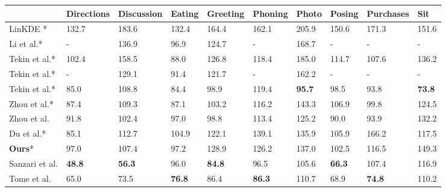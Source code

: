 \documentclass[10pt,journal,compsoc]{IEEEtran}
\makeatletter
\newcommand*{\etal}{et al.\@\xspace}
\makeatother
\begin{document}
\begin{table*}
\begin{center}
\begin{tabularx}{\linewidth}{lsssssssss}
\toprule \midrule
						& Directions     & Discussion		& Eating	 & Greeting       & Phoning        & Photo           & Posing         & Purchases      	& Sit\\
\toprule \midrule
LinKDE \cite{h36m_pami}*           		& 132.7          & 183.6      		& 132.4       	 & 164.4          & 162.1          & 205.9           & 150.6          & 171.3         	& 151.6\\ 
Li \etal \cite{LiC14}*            		& -              & 136.9 	      	& 96.9        	 & 124.7          & -              & 168.7 	     & -              & -              	& - \\
Tekin \etal \cite{tekin2015predicting}*    	& 102.4   	 & 158.5 	      	& 88.0        	 & 126.8          & 118.4          & 185.0           & 114.7          & 107.6         	& 136.2\\
Tekin \etal \cite{tekin2016structured}*    	& -              & 129.1 	      	& 91.4        	 & 121.7          & -              & 162.2           & -              & -              	& - \\
Tekin \etal \cite{tekin2016fusing}*        	& 85.0           & 108.8 	      	& 84.4        	 & 98.9       	  & 119.4          & \textbf{95.7}   & 98.5           & 93.8          	& \textbf{73.8}\\
Zhou \etal \cite{zhou2016sparseness}*      	& 87.4           & 109.3 	      	& 87.1        	 & 103.2      	  & 116.2          & 143.3           & 106.9          & 99.8          	& 124.5\\
Zhou \etal \cite{zhou2016deep} 	 		& 91.8 		 & 102.4		& 97.0 		 & 98.8 	  & 113.4 	   & 125.2	     & 90.0 	      & 93.9 	        & 132.2\\
Du \etal \cite{du2016marker}*			& 85.1		 & 112.7		& 104.9		 & 122.1	  & 139.1	   & 135.9	     & 105.9	      & 166.2		& 117.5\\ 
\textbf{Ours}*			 		& 97.0	 	 & 107.4 	   	& 97.2 		 & 128.9 	  & 126.2 	   & 137.0 	     & 102.5 	      & 116.5 		& 149.3\\ \midrule 
Sanzari \etal \cite{sanzari2016bayesian}  	& \textbf{48.8}  & \textbf{56.3} 	& 96.0          & \textbf{84.8}   & 96.5           & 105.6           & \textbf{66.3}  & 107.4           & 116.9 \\
Tome \etal \cite{tome2017lifting} 		& 65.0           & 73.5          	& \textbf{76.8}  & 86.4           & \textbf{86.3}  & 110.7           & 68.9           & \textbf{74.8}   & 110.2\\

\end{tabularx}
\end{center}
\end{table*}
\end{document}
